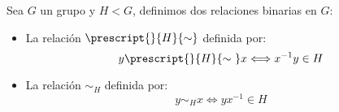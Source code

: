 \begin{definicion}
    Sea $G$ un grupo y $H < G$, definimos dos relaciones binarias en $G$:
    \begin{itemize}
        \item La relación $\prescript{}{H}{\sim}$ definida por:
            \begin{equation*}
                y \prescript{}{H}{\sim\ } x \Longleftrightarrow x^{-1}y\in H
            \end{equation*}
        \item La relación $\sim_H$ definida por:
            \begin{equation*}
                y\sim_H x \Longleftrightarrow yx^{-1} \in  H
            \end{equation*}
    \end{itemize}
\end{definicion}

